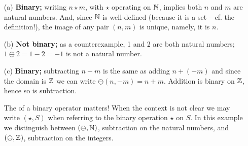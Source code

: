 \documentclass[../UNABRIDGEDalgebraNotesMSRI-UP2016.tex]{subfiles}
\begin{document}
\begin{frame}
\begin{itemize}
\item[(a)]\textbf{Binary;} writing $n\star m$, with $\star$ operating on $\mathbb N$, implies both $n$ and $m$ are natural numbers.  And, since $\mathbb N$ is well-defined (because it is a set -- cf. the definition!), the image of any pair $(n,m)$ is unique, namely, it is $n$.

\smallGap
\item[(b)]\label{sol:binary(b)} \textbf{Not binary;} as a counterexample, 1 and 2 are both natural numbers; $1\ominus 2=1-2=-1$ is not a natural number. 

\smallGap
\item[(c)] \textbf{Binary;} subtracting $n-m$ is the same as adding $n+(-m)$ and since the domain is $\mathbb Z$ we can write $\ominus(n,-m)=n+m$.  Addition is binary on $\mathbb Z$, hence so is subtraction.  

\smallGap
The  of a binary operator matters!  When the context is not clear we may write $(\star, S)$ when referring to the binary operation $\star$ on $S$.  In this example we distinguish between $(\ominus, \mathbb N)$, subtraction on the natural numbers, and $(\ominus, \mathbb Z)$, subtraction on the integers.
\end{itemize}
\end{frame}
\end{document}
